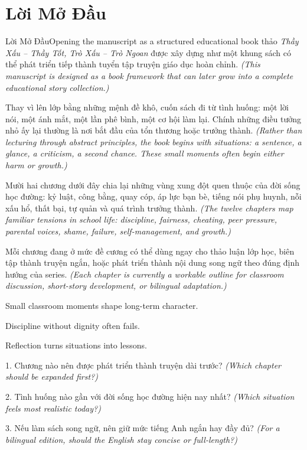 \chapter*{Lời Mở Đầu}

\begin{truyen}{Lời Mở Đầu}{Opening the manuscript as a structured educational book}
 thảo \textit{Thầy Xấu -- Thầy Tốt, Trò Xấu -- Trò Ngoan} được xây dựng như một khung sách có thể phát triển tiếp thành tuyển tập truyện giáo dục hoàn chỉnh.
\textit{(This manuscript is designed as a book framework that can later grow into a complete educational story collection.)}

Thay vì lên lớp bằng những mệnh đề khô, cuốn sách đi từ tình huống: một lời nói, một ánh mắt, một lần phê bình, một cơ hội làm lại. Chính những điều tưởng nhỏ ấy lại thường là nơi bắt đầu của tổn thương hoặc trưởng thành.
\textit{(Rather than lecturing through abstract principles, the book begins with situations: a sentence, a glance, a criticism, a second chance. These small moments often begin either harm or growth.)}

Mười hai chương dưới đây chia lại những vùng xung đột quen thuộc của đời sống học đường: kỷ luật, công bằng, quay cóp, áp lực bạn bè, tiếng nói phụ huynh, nỗi xấu hổ, thất bại, tự quản và quá trình trưởng thành.
\textit{(The twelve chapters map familiar tensions in school life: discipline, fairness, cheating, peer pressure, parental voices, shame, failure, self-management, and growth.)}
\end{truyen}

\begin{baihoc}
Mỗi chương đang ở mức đề cương có thể dùng ngay cho thảo luận lớp học, biên tập thành truyện ngắn, hoặc phát triển thành nội dung song ngữ theo đúng định hướng của series.
\textit{(Each chapter is currently a workable outline for classroom discussion, short-story development, or bilingual adaptation.)}
\end{baihoc}

\begin{ghinhoanh}
Small classroom moments shape long-term character.

Discipline without dignity often fails.

Reflection turns situations into lessons.
\end{ghinhoanh}

\begin{tuhocnhanh}
1. Chương nào nên được phát triển thành truyện dài trước? \textit{(Which chapter should be expanded first?)}

2. Tình huống nào gần với đời sống học đường hiện nay nhất? \textit{(Which situation feels most realistic today?)}

3. Nếu làm sách song ngữ, nên giữ mức tiếng Anh ngắn hay đầy đủ? \textit{(For a bilingual edition, should the English stay concise or full-length?)}
\end{tuhocnhanh}

\ngancach
